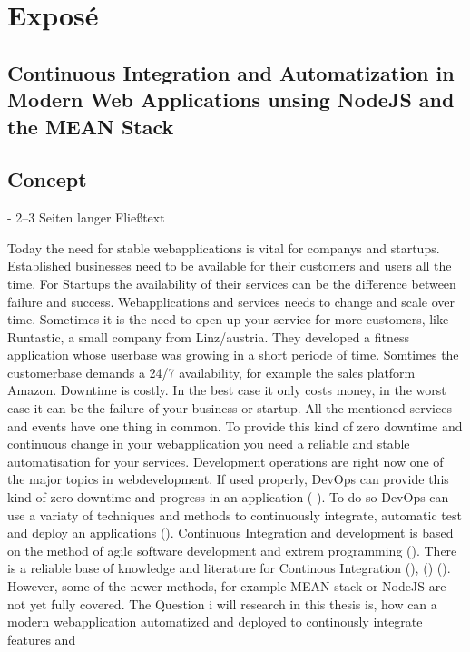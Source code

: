 \section{Exposé}

\subsection{Continuous Integration and Automatization in Modern Web Applications unsing NodeJS and the MEAN Stack}


\subsection{Concept}
- 2–3 Seiten langer Fließtext

Today the need for stable webapplications is vital for companys and startups. Established businesses need to be
available for their customers and users all the time. For Startups the availability of their services can be the difference
between failure and success. Webapplications and services needs to change and scale over time. Sometimes it is the need
to open up your service for more customers, like Runtastic, a small company from Linz/austria. They developed
a fitness application whose userbase was growing in a short periode of time. Somtimes the customerbase demands a 24/7
availability, for example the sales platform Amazon. Downtime is costly. In the best case it only costs money, in the worst case
it can be the failure of your business or startup. All the mentioned services and events have one thing in common. To provide this kind of zero downtime and continuous change in
your webapplication you need a reliable and stable automatisation for your services. Development operations are right now one of
the major topics in webdevelopment. If used properly, DevOps can provide this kind of zero downtime and progress in an application
(\cite{humble2010continuous} \cite{duvall2007continuous}). To do so DevOps can use a variaty of techniques and methods to continuously
integrate, automatic test and deploy an applications (\cite{meyer2014continuous}).
Continuous Integration and development is based on the method of agile software development and extrem programming
(\cite{lindstrom2004extreme}). There is a reliable base of knowledge and literature for Continous Integration
(\cite{schaefer2013continuous}), (\cite{fowler2006continuous}) (\cite{fowler2012continuous}). However, some of the newer methods, for example
MEAN stack or NodeJS are not yet fully covered.
The Question i will research in this thesis is, how can a modern webapplication automatized and deployed to continously integrate features and
